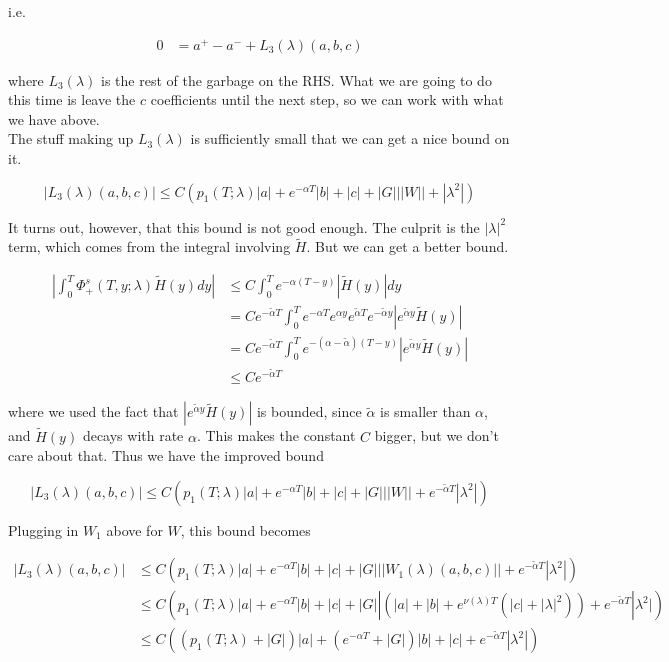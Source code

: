 \documentclass[12pt]{article}
\begin{document}
\begin{enumerate}
i.e. 

\begin{align*}
0 &= a^+ - a^- + L_3(\lambda)(a, b, c)
\end{align*}

where $L_3(\lambda)$ is the rest of the garbage on the RHS. What we are going to do this time is leave the $c$ coefficients until the next step, so we can work with what we have above.\\

The stuff making up $L_3(\lambda)$ is sufficiently small that we can get a nice bound on it. 

\[
|L_3(\lambda)(a, b, c)| \leq C ( p_1(T; \lambda)|a|
+ e^{-\alpha T}|b| + |c| + |G|||W|| + |\lambda^2| )
\]

It turns out, however, that this bound is not good enough. The culprit is the $|\lambda|^2$ term, which comes from the integral involving $\tilde{H}$. But we can get a better bound.

\begin{align*}
\left| \int_0^T \Phi^s_+(T, y; \lambda) \tilde{H}(y) dy \right| 
&\leq C \int_0^T e^{-\alpha (T - y)}|\tilde{H}(y)| dy \\
&= C e^{-\tilde{\alpha}T} \int_0^T e^{-\alpha T} e^{\alpha y}  e^{\tilde{\alpha}T} e^{-\tilde{\alpha}y} |e^{\tilde{\alpha}y} \tilde{H}(y)| \\
&= C e^{-\tilde{\alpha}T} \int_0^T e^{-(\alpha - \tilde{\alpha})(T-y)} |e^{\tilde{\alpha}y} \tilde{H}(y)|\\
&\leq C e^{-\tilde{\alpha}T} 
\end{align*}

where we used the fact that $|e^{\tilde{\alpha}y} \tilde{H}(y)|$ is bounded, since $\tilde{\alpha}$ is smaller than $\alpha$, and $\tilde{H}(y)$ decays with rate $\alpha$. This makes the constant $C$ bigger, but we don't care about that. Thus we have the improved bound

\[
|L_3(\lambda)(a, b, c)| \leq C ( p_1(T; \lambda)|a|
+ e^{-\alpha T}|b| + |c| + |G|||W|| + e^{-\tilde{\alpha}T} |\lambda^2| )
\]

Plugging in $W_1$ above for $W$, this bound becomes


\begin{align*}
|L_3(\lambda)(a, b, c)| &\leq C ( p_1(T; \lambda)|a|
+ e^{-\alpha T}|b| + |c| + |G|||W_1(\lambda)(a,b,c)|| + e^{-\tilde{\alpha}T} |\lambda^2| ) \\ 
&\leq C ( p_1(T; \lambda)|a|
+ e^{-\alpha T}|b| + |c| + |G||(|a| + |b| + e^{\nu(\lambda)T}(|c| + |\lambda|^2)) + e^{-\tilde{\alpha}T}|\lambda^2| ) \\
&\leq C ( (p_1(T; \lambda) + |G|)|a| + (e^{-\alpha T} + |G|)|b| + |c| + e^{-\tilde{\alpha}T}|\lambda^2| ) 
\end{align*}


\end{enumerate}
\end{document}
